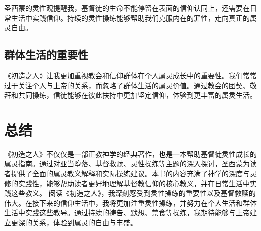 \documentclass[12pt, a4paper]{ctexart}
\begin{document}
圣西蒙的灵性观提醒我，基督徒的生命不能停留在表面的信仰认同上，还需要在日常生活中实践信仰。持续的灵性操练能够帮助我们克服内在的罪性，走向真正的属灵自由。
\subsection{群体生活的重要性}
《初造之人》让我更加重视教会和信仰群体在个人属灵成长中的重要性。我们常常过于关注个人与上帝的关系，而忽略了群体生活的属灵价值。通过教会的团契、敬拜和共同操练，信徒能够在彼此扶持中更加坚定信仰，体验到更丰富的属灵生活。
\section{总结}
《初造之人》不仅仅是一部正教神学的经典著作，也是一本帮助基督徒灵性成长的属灵指南。通过对亚当堕落、基督救赎、灵性操练等主题的深入探讨，圣西蒙为读者提供了全面的属灵教义解释和实际操练建议。本书的内容充满了神学的深度与灵修的实践性，能够帮助读者更好地理解基督教信仰的核心教义，并在日常生活中实践这些教义。
阅读《初造之人》，我深刻感受到灵性操练的重要性以及基督救赎的伟大。在接下来的信仰生活中，我将更加注重灵性操练，并努力在个人生活和群体生活中实践这些教导。通过持续的祷告、默想、禁食等操练，我期待能够与上帝建立更深的关系，体验到属灵的自由与丰盛。
\end{document}
